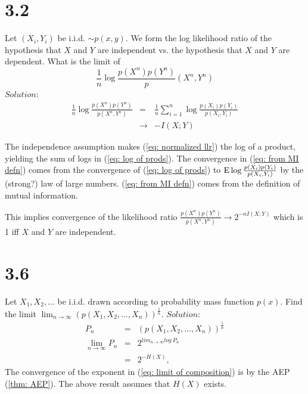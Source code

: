 \documentclass[10pt]{article}
\DeclareMathOperator*{\E}{\mbox{\text{E}}}
\newcommand{\pref}[1]{{(\ref{#1})}}
\begin{document}
\begin{scriptsize}
\begin{multicols}{3}
\section*{3.2}
Let $(X_i,Y_i)$ be i.i.d. $\sim p(x,y)$. We form the log likelihood ratio
of the hypothesis that $X$ and $Y$ are independent vs. the hypothesis that
$X$ and $Y$ are dependent. What is the limit of
\begin{equation}
    \frac{1}{n}\log \frac{p(X^n)p(Y^n)}p(X^n,Y^n)
    \label{eq: normalized llr}
\end{equation}
$Solution$:
\begin{eqnarray}
    \frac{1}{n}\log \frac{p(X^n)p(Y^n)}{p(X^n,Y^n)}
    &=& \frac{1}{n} \sum_{i=1}^{n} \log \frac{p(X_i)p(Y_i)}{p(X_i,Y_i)}
    \label{eq: log of prods} \\
    &\rightarrow& -I(X;Y) 
    \label{eq: from MI defn}
\end{eqnarray}

The independence assumption makes \pref{eq: normalized llr} the log of a
product, yielding the sum of logs in \pref{eq: log of prods}.
The convergence in \pref{eq: from MI defn} comes from the convergence of
\pref{eq: log of prods} to $\E \log \frac{p(X_i)p(Y_i)}{p(X_i,Y_i)}$ by
the (strong?) law of large numbers. \pref{eq: from MI defn} comes from the
definition of mutual information.

This implies convergence of the likelihood ratio
$\frac{p(X^n)p(Y^n)}{p(X^n,Y^n)} \rightarrow 2^{-nI(X;Y)}$ which is 1 iff
$X$ and $Y$ are independent.
\section*{3.6}
Let $X_1,X_2,\dots$ be i.i.d. drawn according to probability mass function
$p(x)$. Find the limit $\lim_{n \to \infty}
(p(X_1,X_2,\dots,X_n))^{\frac{1}{n}}$.
$Solution$:
\begin{eqnarray}
    P_n &=& (p(X_1,X_2,\dots,X_n))^{\frac{1}{n}}
        \label{eq: defn P_n} \\
    \lim_{n\to \infty} P_n &=& 2^{lim_{n\to\infty}log\ P_n}
        \label{eq: limit of composition} \\
    &=& 2^{-H(X)},
        \label{eq: P_n limit} 
    \end{eqnarray} 
    The convergence of the exponent in \pref{eq: limit of composition} is
    by the AEP \pref{thm: AEP}.
    The above result assumes that $H(X)$ exists.

\end{multicols}
\end{scriptsize}
\end{document}
